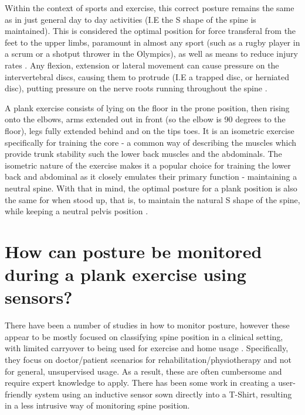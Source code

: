 \documentclass[sigconf]{acmart}
\begin{document}
Within the context of sports and exercise, this correct posture remains the same as in just general day to day activities (I.E the S shape of the spine is maintained). This is considered the optimal position for force transferal from the feet to the upper limbs, paramount in almost any sport (such as a rugby player in a scrum or a shotput thrower in the Olympics), as well as means to reduce injury rates \cite{videman1997lifetime}.  Any flexion, extension or lateral movement can cause pressure on the intervertebral discs, causing them to protrude (I.E a trapped disc, or herniated disc), putting pressure on the nerve roots running throughout the spine \cite{videman1997lifetime}. 

A plank exercise consists of lying on the floor in the prone position, then rising onto the elbows, arms extended out in front (so the elbow is 90 degrees to the floor), legs fully extended behind and on the tips toes. It is an isometric exercise specifically for training the core \mbox{-} a common way of describing the muscles which provide trunk stability such the lower back muscles and the abdominals.  The isometric nature of the exercise makes it a popular choice for training the lower back and abdominal as it closely emulates their primary function \mbox{-} maintaining a neutral spine. With that in mind, the optimal posture for a plank position is also the same for when stood up, that is, to maintain the natural S shape of the spine, while keeping a neutral pelvis position \cite{cortell2017influence}.



\section{How can posture be monitored during a plank exercise using sensors?}

There have been a number of studies in how to monitor posture, however these appear to be mostly focused on classifying spine position in a clinical setting, with limited carryover to being used for exercise and home usage  \cite{wong2008detecting, voinea2016measurement, wong2008smart} . Specifically, they focus on doctor/patient scenarios for rehabilitation/physiotherapy and not for general, unsupervised usage. As a result, these are often cumbersome and require expert knowledge to apply. There has been some work in creating a user-friendly system \cite{sardini2015wireless} using an inductive sensor sown directly into a T-Shirt, resulting in a less intrusive way of monitoring spine position.   
\end{document}
